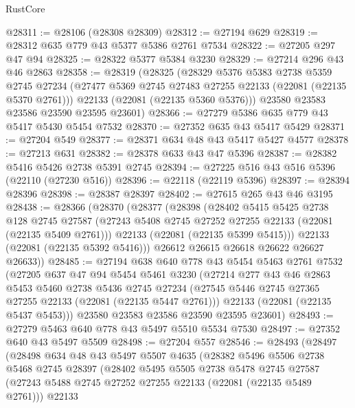 \begin{lexlean}{RustCore}
\begin{coremodule}
@28311 := @28106 (@28308 @28309)
@28312 := @27194 @629
@28319 := @28312 @635 @779 @43 @5377 @5386 @2761 @7534
@28322 := @27205 @297 @47 @94
@28325 := @28322 @5377 @5384 @3230
@28329 := @27214 @296 @43 @46 @2863
@28358 := @28319
    (@28325
      (@28329
        @5376
        @5383
        @2738
        @5359
        @2745
        @27234
        (@27477 @5369 @2745 @27483 @27255 @22133 (@22081 (@22135 @5370 @2761)))
        @22133
        (@22081 (@22135 @5360 @5376)))
      @23580
      @23583
      @23586
      @23590
      @23595
      @23601)
@28366 := @27279 @5386 @635 @779 @43 @5417 @5430 @5454 @7532
@28370 := @27352 @635 @43 @5417 @5429
@28371 := @27204 @549
@28377 := @28371 @634 @48 @43 @5417 @5427 @4577
@28378 := @27213 @631
@28382 := @28378 @633 @43 @47 @5396
@28387 := @28382 @5416 @5426 @2738 @5391 @2745
@28394 := @27225 @516 @43 @516 @5396 (@22110 (@27230 @516))
@28396 := @22118 (@22119 @5396)
@28397 := @28394 @28396
@28398 := @28387 @28397
@28402 := @27615 @265 @43 @46 @3195
@28438 := @28366
    (@28370
      (@28377
        (@28398
          (@28402
            @5415
            @5425
            @2738
            @128
            @2745
            @27587
            (@27243 @5408 @2745 @27252 @27255 @22133 (@22081 (@22135 @5409 @2761)))
            @22133
            (@22081 (@22135 @5399 @5415)))
          @22133
          (@22081 (@22135 @5392 @5416)))
        @26612
        @26615
        @26618
        @26622
        @26627
        @26633))
@28485 := @27194
    @638
    @640
    @778
    @43
    @5454
    @5463
    @2761
    @7532
    (@27205
      @637
      @47
      @94
      @5454
      @5461
      @3230
      (@27214
        @277
        @43
        @46
        @2863
        @5453
        @5460
        @2738
        @5436
        @2745
        @27234
        (@27545 @5446 @2745 @27365 @27255 @22133 (@22081 (@22135 @5447 @2761)))
        @22133
        (@22081 (@22135 @5437 @5453)))
      @23580
      @23583
      @23586
      @23590
      @23595
      @23601)
@28493 := @27279 @5463 @640 @778 @43 @5497 @5510 @5534 @7530
@28497 := @27352 @640 @43 @5497 @5509
@28498 := @27204 @557
@28546 := @28493
    (@28497
      (@28498
        @634
        @48
        @43
        @5497
        @5507
        @4635
        (@28382
          @5496
          @5506
          @2738
          @5468
          @2745
          @28397
          (@28402
            @5495
            @5505
            @2738
            @5478
            @2745
            @27587
            (@27243 @5488 @2745 @27252 @27255 @22133 (@22081 (@22135 @5489 @2761)))
            @22133

\end{coremodule}
\end{lexlean}
